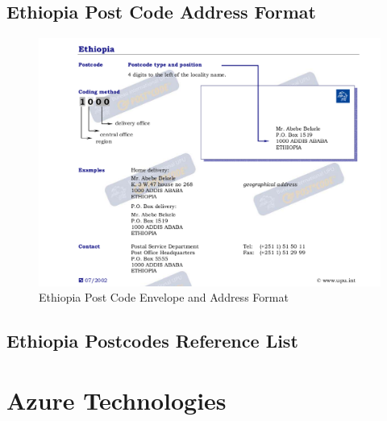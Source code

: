 \begin{appendices}
\section{Ethiopia Post Code Address Format}
\begin{figure}[!h]
\includegraphics[width=15cm,keepaspectratio]{images/ethio_postcode_addressing}
\caption{Ethiopia Post Code Envelope and Address Format}
\end{figure}

\section{Ethiopia Postcodes Reference List}



\chapter{Azure Technologies}

\end{appendices}